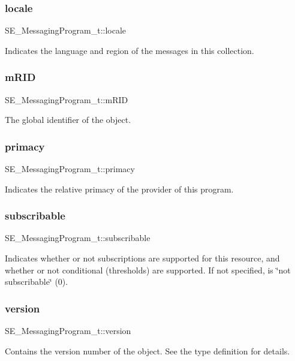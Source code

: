 \subsubsection{\texorpdfstring{locale}{locale}}
{\footnotesize\ttfamily S\+E\+\_\+\+Messaging\+Program\+\_\+t\+::locale}

Indicates the language and region of the messages in this collection. \mbox{\label{group__MessagingProgram_ga76dee6cf9af1a2113b116d4eb87805bb}} 
\subsubsection{\texorpdfstring{m\+R\+ID}{mRID}}
{\footnotesize\ttfamily S\+E\+\_\+\+Messaging\+Program\+\_\+t\+::m\+R\+ID}

The global identifier of the object. \mbox{\label{group__MessagingProgram_ga5923a2dd14be22f05ec8b33c73a4676e}} 
\subsubsection{\texorpdfstring{primacy}{primacy}}
{\footnotesize\ttfamily S\+E\+\_\+\+Messaging\+Program\+\_\+t\+::primacy}

Indicates the relative primacy of the provider of this program. \mbox{\label{group__MessagingProgram_ga00670f1887e83efd074cb1c3431b1723}} 
\subsubsection{\texorpdfstring{subscribable}{subscribable}}
{\footnotesize\ttfamily S\+E\+\_\+\+Messaging\+Program\+\_\+t\+::subscribable}

Indicates whether or not subscriptions are supported for this resource, and whether or not conditional (thresholds) are supported. If not specified, is \char`\"{}not subscribable\char`\"{} (0). \mbox{\label{group__MessagingProgram_ga63c952695fdbc82efa3253c42745a7f8}} 
\subsubsection{\texorpdfstring{version}{version}}
{\footnotesize\ttfamily S\+E\+\_\+\+Messaging\+Program\+\_\+t\+::version}

Contains the version number of the object. See the type definition for details. 